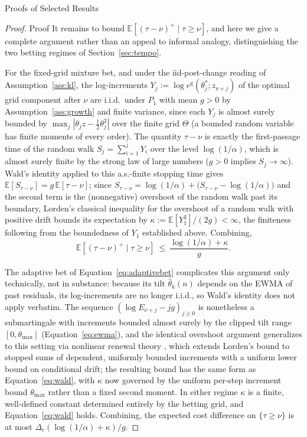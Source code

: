 \documentclass[trsc,dblanonrev]{informs4}
\newcommand{\E}{\mathbb{E}}
\begin{document}
\begin{APPENDIX}{Proofs of Selected Results}
\begin{proof}{Proof}
It remains to bound $\E[(\tau - \nu)^+ \mid \tau \ge \nu]$, and here we
give a complete argument rather than an appeal to informal analogy,
distinguishing the two betting regimes of Section~\ref{sec:tempo}.

For the fixed-grid mixture bet, and under the iid-post-change reading
of Assumption~\ref{ass:kl}, the log-increments $Y_j := \log
e^{\mathrm{g}}(\theta_j^\ast; z_{\nu+j})$ of the optimal grid component
after $\nu$ are i.i.d.\ under $P_1$ with mean $g > 0$ by
Assumption~\ref{ass:growth} and finite variance, since each $Y_j$ is
almost surely bounded by $\max_j |\theta_j z - \tfrac12 \theta_j^2|$
over the finite grid $\Theta$ (a bounded random variable has finite
moments of every order). The quantity $\tau - \nu$ is exactly the
first-passage time of the random walk $S_j = \sum_{i=1}^j Y_i$ over the
level $\log(1/\alpha)$, which is almost surely finite by the strong law
of large numbers ($g>0$ implies $S_j \to \infty$). Wald's identity
\citep{wald1945sequential} applied to this a.s.-finite stopping time
gives $\E[S_{\tau-\nu}] = g\,\E[\tau-\nu]$; since $S_{\tau-\nu} =
\log(1/\alpha) + \big(S_{\tau-\nu} - \log(1/\alpha)\big)$ and the second
term is the (nonnegative) overshoot of the random walk past its
boundary, Lorden's classical inequality for the overshoot of a random
walk with positive drift \citep{lorden1970excess} bounds its
expectation by $\kappa := \E[Y_1^2]/(2g) < \infty$, the finiteness
following from the boundedness of $Y_1$ established above. Combining,
\begin{equation}\label{eq:wald}
\E[(\tau - \nu)^+ \mid \tau \ge \nu] \ \le\ \frac{\log(1/\alpha) +
\kappa}{g}.
\end{equation}

The adaptive bet of Equation~\eqref{eq:adaptivebet} complicates this
argument only technically, not in substance: because its tilt
$\widehat\theta_k(n)$ depends on the EWMA of past residuals, its
log-increments are no longer i.i.d., so Wald's identity does not apply
verbatim. The sequence $(\log E_{\nu+j} - jg)_{j \ge 0}$ is nonetheless
a submartingale with increments bounded almost surely by the clipped
tilt range $[0,\theta_{\max}]$ (Equation~\eqref{eq:ewma}), and the
identical overshoot argument generalizes to this setting via nonlinear
renewal theory \citep{woodroofe1982nonlinear}, which extends Lorden's
bound to stopped sums of dependent, uniformly bounded increments with a
uniform lower bound on conditional drift; the resulting bound has the
same form as Equation~\eqref{eq:wald}, with $\kappa$ now governed by
the uniform per-step increment bound $\theta_{\max}$ rather than a
fixed second moment. In either regime $\kappa$ is a finite,
well-defined constant determined entirely by the betting grid, and
Equation~\eqref{eq:wald} holds. Combining, the expected cost difference
on $\{\tau \ge \nu\}$ is at most $\Delta_c (\log(1/\alpha)+\kappa)/g$.


\end{proof}
\end{APPENDIX}
\end{document}
